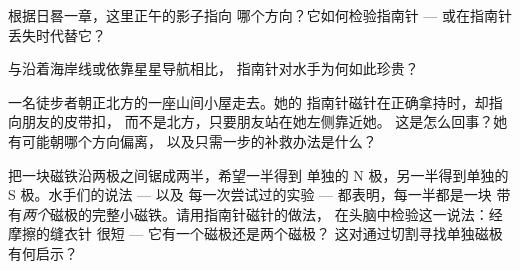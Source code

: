 \begin{exercise}[$\star$]\label{exo:g4:magnets-and-compass:8}
根据日晷一章，这里正午的影子指向
哪个方向？它如何检验指南针 ---
或在指南针丢失时代替它？
\end{exercise}

\begin{exercise}[$\star$]\label{exo:g4:magnets-and-compass:9}
与沿着海岸线或依靠星星导航相比，
指南针对水手为何如此珍贵？
\end{exercise}

\begin{exercise}[$\star\star$]\label{exo:g4:magnets-and-compass:10}
一名徒步者朝正北方的一座山间小屋走去。她的
指南针磁针在正确拿持时，却指向朋友的皮带扣，
而不是北方，只要朋友站在她左侧靠近她。
这是怎么回事？她有可能朝哪个方向偏离，
以及只需一步的补救办法是什么？
\end{exercise}

\begin{exercise}[$\star\star$]\label{exo:g4:magnets-and-compass:11}
把一块磁铁沿两极之间锯成两半，希望一半得到
单独的 N 极，另一半得到单独的 S 极。水手们的说法 --- 以及
每一次尝试过的实验 --- 都表明，每一半都是一块
带有\emph{两个}磁极的完整小磁铁。请用指南针磁针的做法，
在头脑中检验这一说法：经摩擦的缝衣针
很短 --- 它有一个磁极还是两个磁极？
这对通过切割寻找单独磁极有何启示？
\end{exercise}

